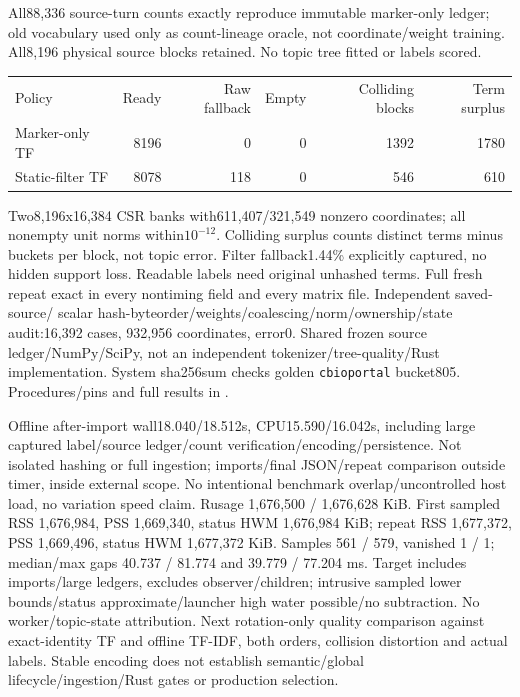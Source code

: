 \documentclass[11pt]{article}
\begin{document}
All88,336 source-turn counts exactly reproduce immutable marker-only ledger;
old vocabulary used only as count-lineage oracle, not coordinate/weight training.
All8,196 physical source blocks retained. No topic tree fitted or labels scored.
\begin{center}\begin{tabular}{lrrrrr}
Policy & Ready & Raw fallback & Empty & Colliding blocks & Term surplus \\
Marker-only TF & 8196 & 0 & 0 & 1392 & 1780 \\
Static-filter TF & 8078 & 118 & 0 & 546 & 610
\end{tabular}\end{center}
Two8,196x16,384 CSR banks with611,407/321,549 nonzero coordinates; all nonempty
unit norms within$10^{-12}$. Colliding surplus counts distinct terms minus buckets
per block, not topic error. Filter fallback1.44\% explicitly captured, no hidden
support loss. Readable labels need original unhashed terms. Full fresh repeat
exact in every nontiming field and every matrix file. Independent saved-source/
scalar hash-byteorder/weights/coalescing/norm/ownership/state audit:16,392 cases,
932,956 coordinates, error0. Shared frozen source ledger/NumPy/SciPy, not an
independent tokenizer/tree-quality/Rust implementation. System sha256sum checks
golden \texttt{cbioportal} bucket805. Procedures/pins and full results in
.

Offline after-import wall18.040/18.512s, CPU15.590/16.042s, including large
captured label/source ledger/count verification/encoding/persistence. Not isolated
hashing or full ingestion; imports/final JSON/repeat comparison outside timer,
inside external scope. No intentional benchmark overlap/uncontrolled host load,
no variation speed claim. Rusage 1,676,500 / 1,676,628 KiB. First sampled
RSS 1,676,984, PSS 1,669,340, status HWM 1,676,984 KiB; repeat RSS 1,677,372,
PSS 1,669,496, status HWM 1,677,372 KiB. Samples 561 / 579, vanished 1 / 1;
median/max gaps 40.737 / 81.774 and 39.779 / 77.204 ms. Target includes imports/large
ledgers, excludes observer/children; intrusive sampled lower bounds/status
approximate/launcher high water possible/no subtraction. No worker/topic-state
attribution. Next rotation-only quality comparison against exact-identity TF and
offline TF-IDF, both orders, collision distortion and actual labels. Stable
encoding does not establish semantic/global lifecycle/ingestion/Rust gates or
production selection.
\end{document}
